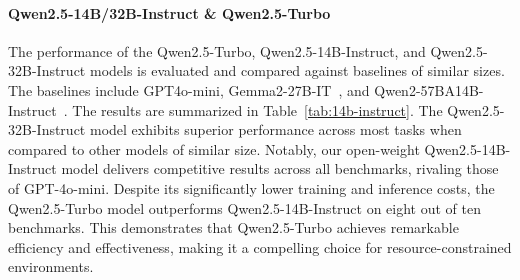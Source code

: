 \paragraph{Qwen2.5-14B/32B-Instruct \& Qwen2.5-Turbo}
The performance of the Qwen2.5-Turbo, Qwen2.5-14B-Instruct, and Qwen2.5-32B-Instruct models is evaluated and compared against baselines of similar sizes. The baselines include GPT4o-mini, Gemma2-27B-IT~\citep{gemma2}, and Qwen2-57BA14B-Instruct~\citep{qwen2}. The results are summarized in Table~\ref{tab:14b-instruct}.
The Qwen2.5-32B-Instruct model exhibits superior performance across most tasks when compared to other models of similar size. Notably, our open-weight Qwen2.5-14B-Instruct model delivers competitive results across all benchmarks, rivaling those of GPT-4o-mini.
Despite its significantly lower training and inference costs, the Qwen2.5-Turbo model outperforms Qwen2.5-14B-Instruct on eight out of ten benchmarks. This demonstrates that Qwen2.5-Turbo achieves remarkable efficiency and effectiveness, making it a compelling choice for resource-constrained environments.


